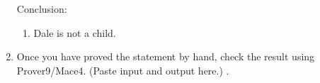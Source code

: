 \documentclass{cs81-homework}
\begin{document}
\begin{enumerate}
  Conclusion:
  \begin{enumerate}
  \item Dale is not a child.
  \end{enumerate}

  \begin{solution}
  \end{solution}
  
\item[]  Once you have proved the statement by hand, check the result
  using Prover9/Mace4.  (Paste input and output here.)  .

  \begin{solution}
  \end{solution}
  
\end{enumerate}
\end{document}
